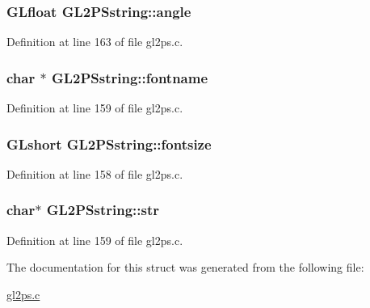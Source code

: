 \subsubsection[{angle}]{\setlength{\rightskip}{0pt plus 5cm}G\+Lfloat G\+L2\+P\+Sstring\+::angle}\label{struct_g_l2_p_sstring_ac9c1f14e619dd358390e467b8999deb3}


Definition at line 163 of file gl2ps.\+c.

\hypertarget{struct_g_l2_p_sstring_a7afa2bce0363ec705d57e7fd4845b292}{}
\subsubsection[{fontname}]{\setlength{\rightskip}{0pt plus 5cm}char $\ast$ G\+L2\+P\+Sstring\+::fontname}\label{struct_g_l2_p_sstring_a7afa2bce0363ec705d57e7fd4845b292}


Definition at line 159 of file gl2ps.\+c.

\hypertarget{struct_g_l2_p_sstring_af7aa09890103ff15ddca41dd82b29b75}{}
\subsubsection[{fontsize}]{\setlength{\rightskip}{0pt plus 5cm}G\+Lshort G\+L2\+P\+Sstring\+::fontsize}\label{struct_g_l2_p_sstring_af7aa09890103ff15ddca41dd82b29b75}


Definition at line 158 of file gl2ps.\+c.

\hypertarget{struct_g_l2_p_sstring_ab4834e08f2449e695293efb4c4c9b5d2}{}
\subsubsection[{str}]{\setlength{\rightskip}{0pt plus 5cm}char$\ast$ G\+L2\+P\+Sstring\+::str}\label{struct_g_l2_p_sstring_ab4834e08f2449e695293efb4c4c9b5d2}


Definition at line 159 of file gl2ps.\+c.



The documentation for this struct was generated from the following file\+:\begin{DoxyCompactItemize}
\item 
\hyperlink{gl2ps_8c}{gl2ps.\+c}\end{DoxyCompactItemize}
